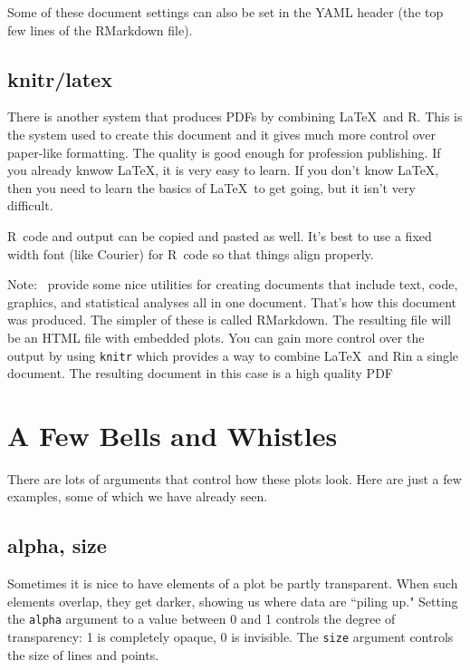 \documentclass[twoside]{book}\usepackage[]{graphicx}\usepackage[]{xcolor}
\newcommand{\Rindex}[1]{\index{\texttt{#1}}}
\newcommand{\option}[1]{{\color{brown!80!black}\texttt{#1}}}
\newcommand{\argument}[1]{{\color{brown!80!black}\texttt{#1}}}
\newcommand{\pkg}[1]{{\color{red!80!black}\texttt{#1}}\Rindex{#1}}
\def\R{{\sf R}}
\newcounter{example}[section]
\begin{document}
Some of these document settings can also be set in the YAML header 
(the top few lines of the RMarkdown file).

\subsection{knitr/latex}
There is another system that produces PDFs by combining \LaTeX\ and \R.  This is the system
used to create this document and it gives much more control over paper-like formatting.  The
quality is good enough for profession publishing.  If you already knwow \LaTeX, it is very
easy to learn.  If you don't know \LaTeX, then you need to learn the basics of \LaTeX\ to get
going, but it isn't very difficult.

\R\ code and output can be copied and pasted as well.  It's best to use a 
fixed width font (like Courier) for \R\ code so that things align properly.

Note:  \RStudio\ provide some nice utilities for creating documents that include
text, code, graphics, and statistical analyses all in one document.  That's how this 
document was produced.  The simpler of these is called RMarkdown.  The resulting file
will be an HTML file with embedded plots.  You can gain more control over the output
by using \pkg{knitr} which provides a way to combine \LaTeX\ and \R in a single
document.  The resulting document in this case is a high quality PDF

\iffalse
\section{A Few Bells and Whistles}
There are lots of arguments that control how these plots look.  Here are just a
few examples, some of which we have already seen.


\subsection{alpha, size}
Sometimes it is nice to have elements of a plot be partly transparent.  When
such elements overlap, they get darker, showing us where data are ``piling up."
Setting the \argument{alpha} argument to a value between 0 and 1 controls the
degree of transparency: 1 is completely opaque, 0 is invisible.  The
\argument{size} argument controls the size of lines and points.
\end{document}
